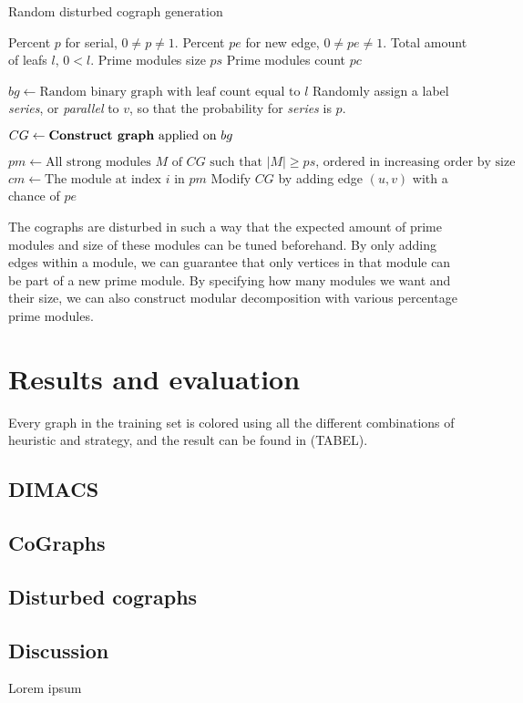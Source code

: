 \documentclass{amsart}
\begin{document}
\begin{algorithm}[H]
    \caption{Random disturbed cograph generation}
  \label{alg:RDCG}
  \begin{algorithmic}[1]
      \REQUIRE Percent $p$ for serial, $0 \neq p \neq 1$.
      \REQUIRE Percent $pe$ for new  edge, $0 \neq pe \neq 1$.
      \REQUIRE Total amount of leafs $l$, $0 < l$.
      \REQUIRE Prime modules size $ps$
      \REQUIRE Prime modules count $pc$

      \STATE $bg \leftarrow \text{Random binary graph with leaf count equal to $l$}$
        \STATE Randomly assign a label  \textit{series}, or \textit{parallel} to $v$, so
        that the probability for \textit{series} is $p$.
      \ENDFOR

      \STATE $CG \leftarrow \text{\textbf{Construct graph} applied on $bg$}$

      \STATE $pm \leftarrow \text{All strong modules $M$ of $CG$ such that $|M| \geq ps$, ordered in increasing order by size}$
        \STATE $cm \leftarrow \text{The module at index $i$ in $pm$}$
            \STATE Modify $CG$ by adding edge $(u,v)$ with a chance of $pe$
        \ENDFOR
      \ENDFOR
  \end{algorithmic}
\end{algorithm}

The cographs are disturbed in such a way that the expected amount of prime
modules and size of these modules can be tuned beforehand. By only adding edges
within a module, we can guarantee that only vertices in that module can be part
of a new prime module. By specifying how many modules we want and their size, we
can also construct modular decomposition with various percentage prime modules.


\section{Results and evaluation}
\label{sec:Result}
Every graph in the training set is colored using all the different combinations
of heuristic and strategy, and the result can be found in (TABEL).

\subsection{DIMACS}

\subsection{CoGraphs}

\subsection{Disturbed cographs}



\subsection{Discussion}

Lorem ipsum

\printbibliography
\end{document}
